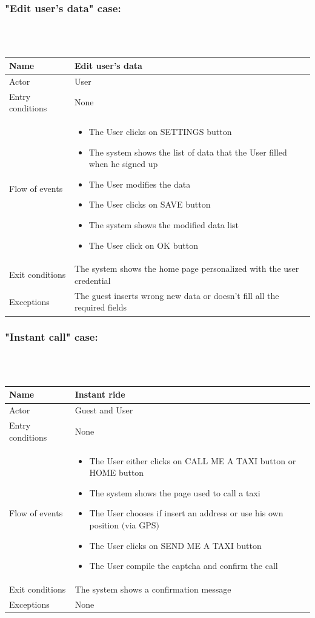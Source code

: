 \newpage
\subsubsection{"Edit user's data" case:}
\hfill \\
\\
\begin{tabular}{|p{3cm}|p{10cm}|}
\hline
Name & Edit user's data\\
\hline
Actor & User\\
\hline
Entry conditions & None\\
\hline
Flow of events &
	\begin{itemize}
		\item The User clicks on SETTINGS button
		\item The system shows the list of data that the User filled when he signed up
		\item The User modifies the data
		\item The User clicks on SAVE button
		\item The system shows the modified data list
		\item The User click on OK button
	\end{itemize}	\\
\hline
Exit conditions & The system shows the home page personalized with the user credential\\
\hline
Exceptions & The guest inserts wrong new data or doesn't fill all the required fields\\
\hline
\end {tabular}


\newpage
\subsubsection{"Instant call" case:}
\hfill \\
\\
\begin{tabular}{|p{3cm}|p{10cm}|}
\hline
Name & Instant ride\\
\hline
Actor & Guest and User\\
\hline
Entry conditions & None\\
\hline
Flow of events &
	\begin{itemize}
		\item The User either clicks on CALL ME A TAXI button or HOME button
		\item The system shows the page used to call a taxi
		\item The User chooses if insert an address or use his own position $($via GPS$)$
		\item The User clicks on SEND ME A TAXI button
		\item The User compile the captcha and confirm the call
	\end{itemize}\\
\hline
Exit conditions & The system shows a confirmation message\\
\hline
Exceptions & None\\
\hline
\end {tabular}

